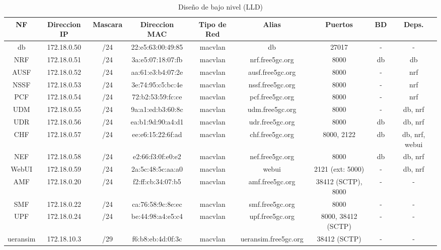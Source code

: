 \begin{table}[H]
\centering
\tiny
\setlength{\tabcolsep}{4pt}
\begin{tabular}{|c|c|c|c|c|c|c|c|c|}
\toprule
\textbf{NF} & \textbf{Direccion IP} & \textbf{Mascara} &\textbf{Direccion MAC} & \textbf{Tipo de Red} & \textbf{Alias} & \textbf{Puertos} & \textbf{BD} & \textbf{Deps.} \\
\midrule
db & 172.18.0.50 & /24 & 22:e5:63:00:49:85 & macvlan & db & 27017 & - & - \\
\midrule
NRF & 172.18.0.51 & /24 & 3a:e5:07:18:07:fb & macvlan & nrf.free5gc.org & 8000 & db & db \\
\midrule
AUSF & 172.18.0.52 & /24 & aa:61:e3:b4:07:2e & macvlan & ausf.free5gc.org & 8000 & - & nrf \\
\midrule
NSSF & 172.18.0.53 & /24 & 3e:74:95:c5:bc:4e & macvlan & nssf.free5gc.org & 8000 & - & nrf \\
\midrule
PCF & 172.18.0.54 & /24 & 72:b2:53:59:fc:ce & macvlan & pcf.free5gc.org & 8000 & - & nrf \\
\midrule
UDM & 172.18.0.55 & /24 & 9a:a1:ed:b3:60:8c & macvlan & udm.free5gc.org & 8000 & - & db, nrf \\
\midrule
UDR & 172.18.0.56 & /24 & ea:b1:9d:90:a4:d1 & macvlan & udr.free5gc.org & 8000 & db & db, nrf \\
\midrule
CHF & 172.18.0.57 & /24 & ee:e6:15:22:6f:ad & macvlan & chf.free5gc.org & 8000, 2122 & db & db, nrf, webui \\
\midrule
NEF & 172.18.0.58 & /24 & e2:66:f3:0f:e0:e2 & macvlan & nef.free5gc.org & 8000 & db & db, nrf \\
\midrule
WebUI & 172.18.0.59 & /24 & 2a:5c:48:5c:aa:a0 & macvlan & webui & 2121 (ext: 5000) & - & db, nrf \\
\midrule
AMF & 172.18.0.20 & /24 & f2:ff:cb:34:07:b5 & macvlan & amf.free5gc.org & 38412 (SCTP), 8000 & - & - \\
\midrule
SMF & 172.18.0.22 & /24 & ca:76:58:9c:8e:ec & macvlan & smf.free5gc.org & 8000 & - & - \\
\midrule
UPF & 172.18.0.24 & /24 & be:44:98:a4:e5:c4 & macvlan & upf.free5gc.org & 8000, 38412 (SCTP) & - & - \\
\midrule
ueransim & 172.18.10.3 & /29 & f6:b8:eb:4d:0f:3c & macvlan & ueransim.free5gc.org & 38412 (SCTP) & - & - \\
\bottomrule
\end{tabular}
\caption{Diseño de bajo nivel (LLD)}
\label{tab:lld_containers}
\end{table}


